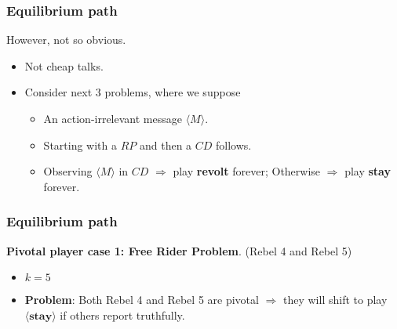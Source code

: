 \documentclass[10pt]{beamer}
\begin{document}
\begin{frame}
\frametitle{Equilibrium path}

However, not so obvious. 
\begin{itemize}
\item Not cheap talks.
\item Consider next 3 problems, where we suppose
\begin{itemize}
\item An action-irrelevant message $\langle M \rangle$.
\item Starting with a $RP$ and then a $CD$ follows. 
\item Observing $\langle M \rangle$ in $CD$ $\Rightarrow$ play \textbf{revolt} forever; Otherwise $\Rightarrow$ play \textbf{stay} forever.
\end{itemize}
\end{itemize}



\end{frame}


\begin{frame}
\frametitle{Equilibrium path}

\textbf{Pivotal player case 1: Free Rider Problem}. (Rebel 4 and Rebel 5)

\begin{itemize}
\item $k=5$


\end{itemize}

\begin{center}
\end{center}

\begin{itemize}
\item \textbf{Problem}: Both Rebel 4 and Rebel 5 are pivotal $\Rightarrow$ they will shift to play $\langle \textbf{stay} \rangle$ if others report truthfully.
\end{itemize}


\end{frame}
\end{document}
